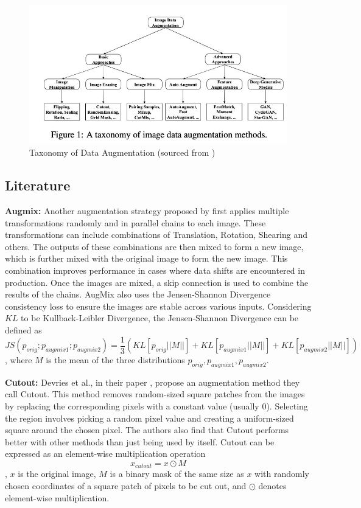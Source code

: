 \begin{itemize}
\end{itemize}

\begin{figure}[htbp]
    \centering
    \includegraphics[width=.9\textwidth]{images/data_aug_categories.png}
    \caption{Taxonomy of Data Augmentation (sourced from \cite{yangImageDataAugmentation2022})}
    \label{fig:categorization_augmentation}
\end{figure}

\subsection{Literature}
\textbf{Augmix: }
Another augmentation strategy proposed by \cite{hendrycksAugMixSimpleData2020} first applies multiple transformations randomly and in parallel chains to each image. These transformations can include combinations of Translation, Rotation, Shearing and others. The outputs of these combinations are then mixed to form a new image, which is further mixed with the original image to form the new image. This combination improves performance in cases where data shifts are encountered in production. Once the images are mixed, a skip connection is used to combine the results of the chains. AugMix also uses the Jensen-Shannon Divergence consistency loss \cite{linDivergenceMeasuresBased} to ensure the images are stable across various inputs. Considering $KL$ to be Kullback-Leibler Divergence, the Jensen-Shannon Divergence can be defined as $$
    JS(p_{orig}; p_{augmix1};p_{augmix2}) = \frac{1}{3}(KL[p_{orig}||M||]+KL[p_{augmix1}||M||]+KL[p_{augmix2}||M||])
$$, where $M$ is the mean of the three distributions $p_{orig}, p_{augmix1}, p_{augmix2}$.

\textbf{Cutout: }
Devries et al., in their paper \cite{devriesImprovedRegularizationConvolutional2017}, propose an augmentation method they call Cutout. This method removes random-sized square patches from the images by replacing the corresponding pixels with a constant value (usually 0). Selecting the region involves picking a random pixel value and creating a uniform-sized square around the chosen pixel. The authors also find that Cutout performs better with other methods than just being used by itself. Cutout can be expressed as an element-wise multiplication operation $$x_{cutout} = x \odot M$$,
$x$ is the original image, $M$ is a binary mask of the same size as $x$ with randomly chosen coordinates of a square patch of pixels to be cut out, and $\odot$ denotes element-wise multiplication.

